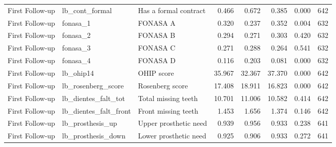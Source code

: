\begin{table}
\begin{tabular}[t]{lllrrrrr}
First Follow-up & lb\_cont\_formal & Has a formal contract & 0.466 & 0.672 & 0.385 & 0.000 & 642\\
First Follow-up & fonasa\_1 & FONASA A & 0.320 & 0.237 & 0.352 & 0.004 & 632\\
First Follow-up & fonasa\_2 & FONASA B & 0.294 & 0.271 & 0.303 & 0.420 & 632\\
First Follow-up & fonasa\_3 & FONASA C & 0.271 & 0.288 & 0.264 & 0.541 & 632\\
\addlinespace
First Follow-up & fonasa\_4 & FONASA D & 0.116 & 0.203 & 0.081 & 0.000 & 632\\
First Follow-up & lb\_ohip14 & OHIP score & 35.967 & 32.367 & 37.370 & 0.000 & 642\\
First Follow-up & lb\_rosenberg\_score & Rosenberg score & 17.408 & 18.911 & 16.823 & 0.000 & 642\\
First Follow-up & lb\_dientes\_falt\_tot & Total missing teeth & 10.701 & 11.006 & 10.582 & 0.414 & 642\\
First Follow-up & lb\_dientes\_falt\_front & Front missing teeth & 1.453 & 1.656 & 1.374 & 0.146 & 642\\
\addlinespace
First Follow-up & lb\_prosthesis\_up & Upper prosthetic need & 0.939 & 0.956 & 0.933 & 0.238 & 641\\
First Follow-up & lb\_prosthesis\_down & Lower prosthetic need & 0.925 & 0.906 & 0.933 & 0.272 & 641\\
\bottomrule
\end{tabular}
\end{table}
